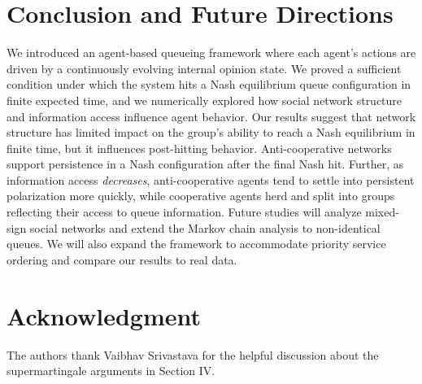 \documentclass[conference]{IEEEtran}
\begin{document}
\section{Conclusion and Future Directions}\label{sec:conclusion}
We introduced an agent-based queueing framework where each agent's actions are driven by a continuously evolving internal opinion state. We proved a sufficient condition under which the system hits a Nash equilibrium queue configuration in finite expected time, and we numerically explored how social network structure and information access influence agent behavior. 
Our results suggest that network structure has limited impact on the group's ability to reach a Nash equilibrium in finite time, but it influences post-hitting behavior.
Anti-cooperative networks support persistence in a Nash configuration after the final Nash hit. Further, as information access \emph{decreases}, anti-cooperative agents tend to settle into persistent polarization more quickly, while cooperative agents herd and split into groups reflecting their access to queue information. 
Future studies will analyze mixed-sign social networks and extend the Markov chain analysis to non-identical queues. We will also expand the framework to accommodate priority service ordering and compare our results to real data.  
 

\section*{Acknowledgment}
The authors thank Vaibhav Srivastava for the helpful discussion about the supermartingale arguments in Section IV. 



\end{document}
